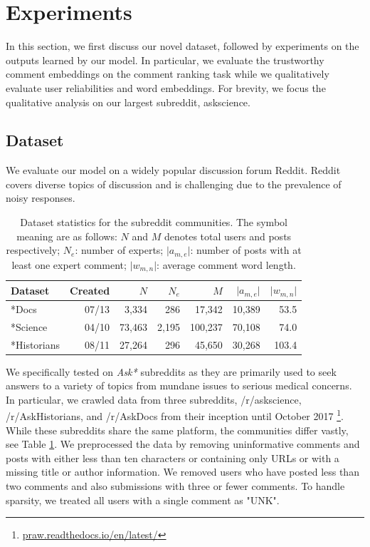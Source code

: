 \section{Experiments} \label{subsec:experiments}
In this section, we first discuss our novel dataset, followed by experiments on the outputs learned by our model. In particular, we evaluate the trustworthy comment embeddings on the comment ranking task while we qualitatively evaluate user reliabilities and word embeddings. For brevity, we focus the qualitative analysis on our largest subreddit, askscience.
\subsection{Dataset} \label{subsec:dataset}
We evaluate our model on a widely popular discussion forum Reddit. Reddit covers diverse topics of discussion and is challenging due to the prevalence of noisy responses.

\begin{table}[tbh]
  \centering
\begin{tabular}{  p{20mm}| r | r | r | r | r | r}
\toprule
  Dataset & Created & $N$ & \textbf{$N_e$} & \textbf{$M$} & \textbf{$\vert a_{m,e} \vert$} & \textbf{$\vert w_{m,n} \vert $} \\ %
  \midrule
 *Docs & 07/13 & 3,334 & 286 & 17,342 & 10,389 & 53.5 \\
 *Science & 04/10 & 73,463 & 2,195 & 100,237 & 70,108 & 74.0\\
*Historians & 08/11 & 27,264 & 296 & 45,650 & 30,268 & 103.4 \\
 \bottomrule
\end{tabular}
\caption{\label{tab:redditdata} Dataset statistics for the subreddit communities. The symbol meaning are as follows: $N$ and $M$ denotes total users and posts respectively; $N_e$: number of experts; $\vert a_{m, e} \vert$: number of posts with at least one expert comment; $\vert w_{m, n} \vert$: average comment word length. }
\end{table}

We specifically tested on \emph{Ask*} subreddits as they are primarily used to seek answers to a variety of topics from mundane issues to serious medical concerns. In particular, we crawled data from three subreddits, /r/askscience, /r/AskHistorians, and /r/AskDocs from their inception until October 2017 \footnote{\url{praw.readthedocs.io/en/latest/} }. While these subreddits share the same platform, the communities differ vastly, see Table \ref{tab:redditdata}. We preprocessed the data by removing uninformative comments and posts with either less than ten characters or containing only URLs or with a missing title or author information.
We removed users who have posted less than two comments and also submissions with three or fewer comments. To handle sparsity, we treated all users with a single comment as "UNK".



